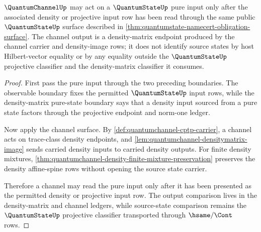 \begin{theorem}
\label{thm:quantumstate-quantumchannel-pure-input-boundary}
$\QuantumChannelUp$ may act on a $\QuantumStateUp$ pure input only after the
associated density or projective input row has been read through the same
public $\QuantumStateUp$ surface described in
\autoref{thm:quantumstate-namecert-obligation-surface}. The channel output is
a density-matrix endpoint produced by the channel carrier and density-image
rows; it does not identify source states by host Hilbert-vector equality or by
any equality outside the $\QuantumStateUp$ projective classifier and the
density-matrix classifier it consumes.
\end{theorem}
\begin{proof}
First pass the pure input through the two preceding boundaries. The observable
boundary fixes the permitted $\QuantumStateUp$ input rows, while the
density-matrix pure-state boundary says that a density input sourced from a
pure state factors through the projective endpoint and norm-one ledger.

Now apply the channel surface. By \autoref{def:quantumchannel-cptp-carrier},
a channel acts on trace-class density endpoints, and
\autoref{lem:quantumchannel-densitymatrix-image} sends carried density inputs
to carried density outputs. For finite density mixtures,
\autoref{thm:quantumchannel-density-finite-mixture-preservation} preserves the
density affine-spine rows without opening the source state carrier.

Therefore a channel may read the pure input only after it has been presented
as the permitted density or projective input row. The output comparison lives
in the density-matrix and channel ledgers, while source-state comparison
remains the $\QuantumStateUp$ projective classifier transported through
$\hsame/\Cont$ rows.
\end{proof}

